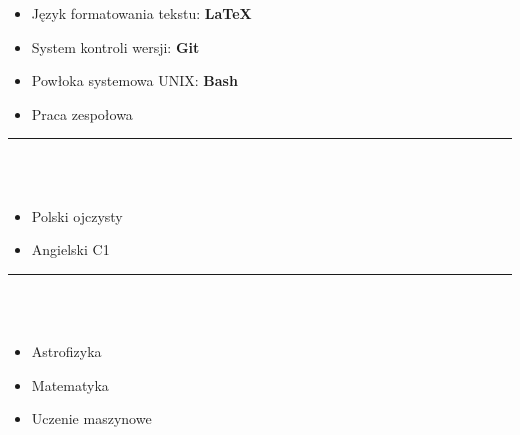 \documentclass[10pt]{article}
\begin{document}
\begin{minipage}[t]{0.30\textwidth}
\begin{itemize}[leftmargin=*]
            \item Język formatowania tekstu: \textbf{LaTeX}
            \item System kontroli wersji: \textbf{Git}
            \item Powłoka systemowa UNIX: \textbf{Bash} 
            \item Praca zespołowa 
        \end{itemize}
        \rule{6cm}{1pt} \\ \\
        \fontsize{10pt}{10pt}
        \begin{itemize}[leftmargin=*]
            \setlength{\parskip}{0pt}
            \item Polski ojczysty
            \item Angielski C1
        \end{itemize}
        \rule{6cm}{1pt} \\ \\
        \fontsize{10pt}{10pt}
        \begin{itemize}[leftmargin=*]
            \setlength{\parskip}{0pt}
            \item Astrofizyka
            \item Matematyka
            \item Uczenie maszynowe
        \end{itemize}
    \end{minipage}
    \hfill %
\end{document}

